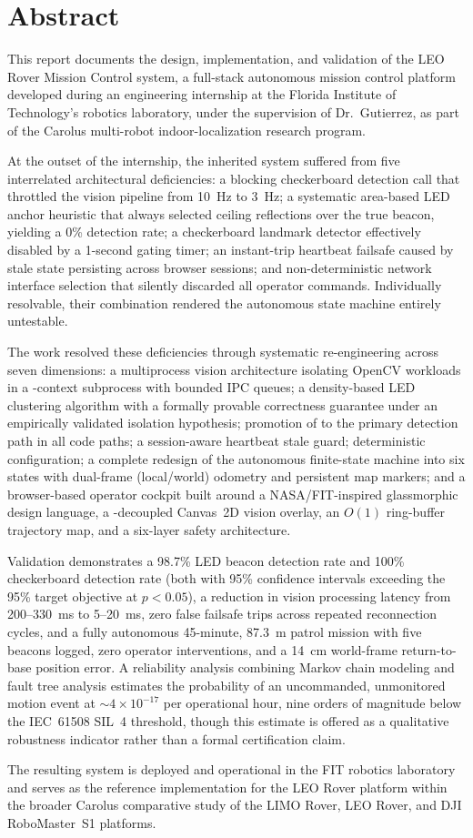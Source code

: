 \chapter*{Abstract}

This report documents the design, implementation, and validation of the LEO Rover Mission Control system, a full-stack autonomous mission control platform developed during an engineering internship at the Florida Institute of Technology's robotics laboratory, under the supervision of Dr.\ Gutierrez, as part of the Carolus multi-robot indoor-localization research program.

At the outset of the internship, the inherited system suffered from five interrelated architectural deficiencies: a blocking checkerboard detection call that throttled the vision pipeline from 10~Hz to 3~Hz; a systematic area-based LED anchor heuristic that always selected ceiling reflections over the true beacon, yielding a 0\% detection rate; a checkerboard landmark detector effectively disabled by a 1-second gating timer; an instant-trip heartbeat failsafe caused by stale state persisting across browser sessions; and non-deterministic network interface selection that silently discarded all operator commands. Individually resolvable, their combination rendered the autonomous state machine entirely untestable.

The work resolved these deficiencies through systematic re-engineering across seven dimensions: a multiprocess vision architecture isolating OpenCV workloads in a -context subprocess with bounded IPC queues; a density-based LED clustering algorithm with a formally provable correctness guarantee under an empirically validated isolation hypothesis; promotion of  to the primary detection path in all code paths; a session-aware heartbeat stale guard; deterministic  configuration; a complete redesign of the autonomous finite-state machine into six states with dual-frame (local/world) odometry and persistent map markers; and a browser-based operator cockpit built around a NASA/FIT-inspired glassmorphic design language, a -decoupled Canvas~2D vision overlay, an $O(1)$ ring-buffer trajectory map, and a six-layer safety architecture.

Validation demonstrates a 98.7\% LED beacon detection rate and 100\% checkerboard detection rate (both with 95\% confidence intervals exceeding the 95\% target objective at $p<0.05$), a reduction in vision processing latency from 200--330~ms to 5--20~ms, zero false failsafe trips across repeated reconnection cycles, and a fully autonomous 45-minute, 87.3~m patrol mission with five beacons logged, zero operator interventions, and a 14~cm world-frame return-to-base position error. A reliability analysis combining Markov chain modeling and fault tree analysis estimates the probability of an uncommanded, unmonitored motion event at $\sim4\times10^{-17}$ per operational hour, nine orders of magnitude below the IEC~61508 SIL~4 threshold, though this estimate is offered as a qualitative robustness indicator rather than a formal certification claim.

The resulting system is deployed and operational in the FIT robotics laboratory and serves as the reference implementation for the LEO Rover platform within the broader Carolus comparative study of the LIMO Rover, LEO Rover, and DJI RoboMaster~S1 platforms.
